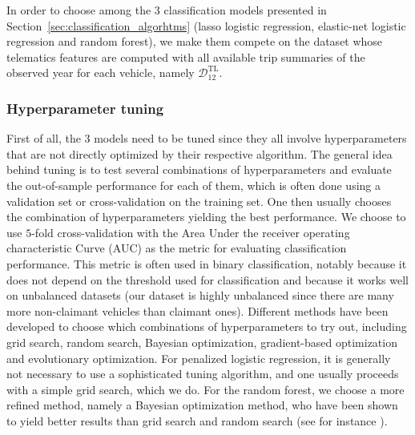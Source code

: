 \documentclass{article}
\begin{document}
In order to choose among the $3$ classification models presented in Section~\ref{sec:classification_algorhtms} (lasso logistic regression, elastic-net logistic regression and random forest), we make them compete on the dataset whose telematics features are computed with all available trip summaries of the observed year for each vehicle, namely $\mathcal{D}_{12}^\text{TL}$. 

\subsubsection{Hyperparameter tuning}\label{hyperparametertuning}

First of all, the $3$ models need to be tuned since they all involve hyperparameters that are not directly optimized by their respective algorithm. The general idea behind tuning is to test several combinations of hyperparameters and evaluate the out-of-sample performance for each of them, which is often done using a validation set or cross-validation on the training set. One then usually chooses the combination of hyperparameters yielding the best performance. We choose to use $5$-fold cross-validation with the Area Under the receiver operating characteristic Curve (AUC) as the metric for evaluating classification performance. This metric is often used in binary classification, notably because it does not depend on the threshold used for classification and because it works well on unbalanced datasets (our dataset is highly unbalanced since there are many more non-claimant vehicles than claimant ones). Different methods have been developed to choose which combinations of hyperparameters to try out, including grid search, random search, Bayesian optimization, gradient-based optimization and evolutionary optimization. For penalized logistic regression, it is generally not necessary to use a sophisticated tuning algorithm, and one usually proceeds with a simple grid search, which we do. For the random forest, we choose a more refined method, namely a Bayesian optimization method, who have been shown to yield better results than grid search and random search (see for instance \cite{snoek2012practical}). 
\end{document}
